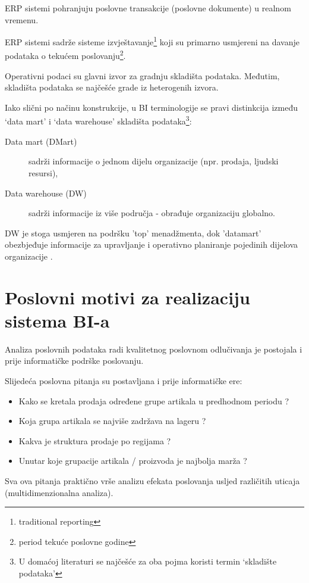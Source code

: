 \documentclass[times, utf8, seminar]{fit}
\begin{document}
ERP sistemi pohranjuju poslovne transakcije (poslovne dokumente) u realnom vremenu.

ERP sistemi sadrže sisteme izvještavanje\footnote{traditional reporting} koji su primarno usmjereni na davanje podataka o tekućem poslovanju\footnote{period tekuće poslovne godine}.

Operativni podaci su glavni izvor za gradnju skladišta podataka. Međutim, skladišta podataka se najčešće grade iz heterogenih izvora.

Iako slični po načinu konstrukcije, u BI terminologije se pravi distinkcija  između `data mart' i `data warehouse' skladišta podataka\footnote{U domaćoj literaturi se najčešće za oba pojma koristi termin `skladište podataka'}:  

\begin{description}
  \item [Data mart (DMart)] sadrži informacije o jednom dijelu organizacije (npr. prodaja, ljudski resursi),
  \item [Data warehouse (DW)] sadrži informacije iz više područja - obrađuje organizaciju globalno.
\end{description}
 
DW je stoga usmjeren na podršku 'top' menadžmenta, dok 'datamart' obezbjeđuje informacije za upravljanje i operativno planiranje pojedinih dijelova organizacije \cite[str.~391]{pentaho32}.

\section{Poslovni motivi za realizaciju sistema BI-a}

Analiza poslovnih podataka radi kvalitetnog poslovnom odlučivanja je postojala i prije informatičke podrške poslovanju.

Slijedeća poslovna pitanja su postavljana i prije informatičke ere:

\begin{itemize}
  \item Kako se kretala prodaja određene grupe artikala u predhodnom periodu ?
  \item Koja grupa artikala se najviše zadržava na lageru ?
  \item Kakva je struktura prodaje po regijama ?
  \item Unutar koje grupacije artikala / proizvoda je najbolja marža ?
\end{itemize} 


Sva ova pitanja praktično vrše analizu efekata poslovanja usljed različitih uticaja (multidimenzionalna analiza).
\end{document}
